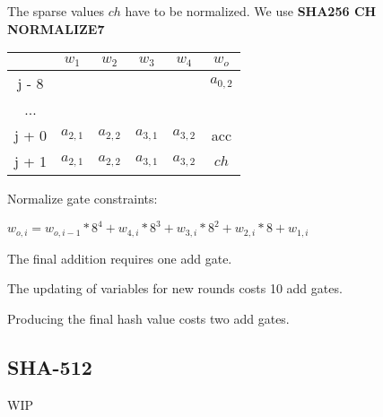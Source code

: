 The sparse values $ch$ have to be normalized.
We use \textbf{SHA256 CH NORMALIZE7}
\begin{center}
\begin{tabular}{ |c|c|c|c|c|c } 
  & $w_1$ & $w_2$ & $w_3$ & $w_4$ & $w_o$\\ 
 \hline
j - 8 &  &  &  &  & $a_{0, 2}$\\ 
... &&&&& \\
j + 0 & $a_{2,1}$ & $ a_{2,2}$ & $a_{3,1}$ & $a_{3,2}$ & acc\\ 
j + 1 & $a_{2,1}$ & $ a_{2,2}$ & $a_{3,1}$ & $a_{3,2}$ & $ch$ \\ 
 \hline
\end{tabular}
\end{center}

Normalize gate constraints:
\begin{center}
$w_{o,i} = w_{o, i - 1} * 8^4 + w_{4,i}*8^3 + w_{3,i}* 8^2 + w_{2,i} * 8 + w_{1,i}$
\end{center}

The final addition requires one add gate.

The updating of variables for new rounds costs 10 add gates.

Producing the final hash value costs two add gates.

\subsection{SHA-512}\label{sha512}

WIP

